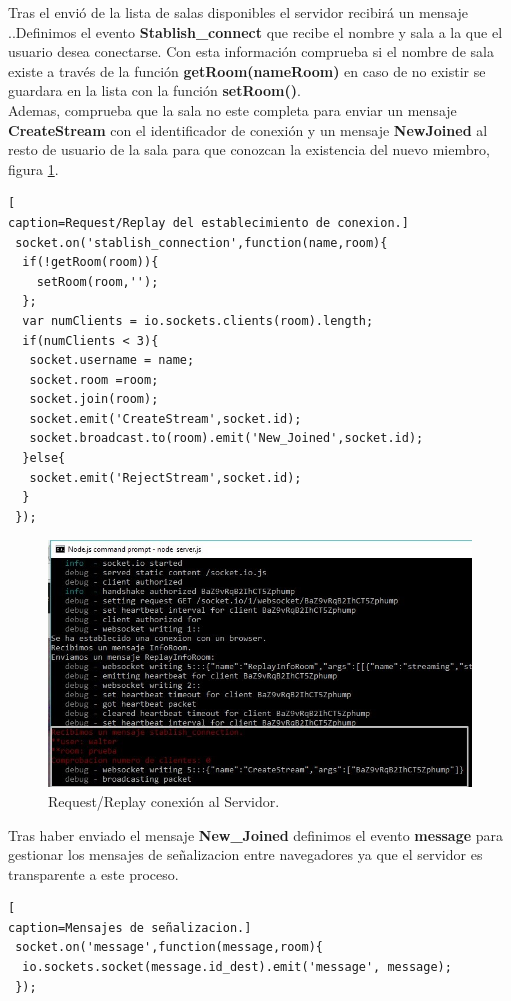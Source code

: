 Tras el envió de la lista de salas disponibles el servidor recibirá un mensaje ..Definimos el evento \textbf{Stablish\_connect} que recibe el nombre y sala a la que el usuario desea conectarse. Con esta información comprueba si el nombre de sala existe a través de la función \textbf{getRoom(nameRoom)} en caso de no existir se guardara en la lista con la función \textbf{setRoom()}.
\\Ademas, comprueba que la sala no este completa para enviar un mensaje \textbf{CreateStream} con el identificador de conexión y un mensaje  \textbf{NewJoined} al resto de usuario de la sala para que conozcan la existencia del nuevo miembro, figura \ref{fig:EjecucionStablishConnection}.
\begin{lstlisting}[
caption=Request/Replay del establecimiento de conexion.]
 socket.on('stablish_connection',function(name,room){
  if(!getRoom(room)){
    setRoom(room,'');
  };
  var numClients = io.sockets.clients(room).length;
  if(numClients < 3){
   socket.username = name;
   socket.room =room;
   socket.join(room);
   socket.emit('CreateStream',socket.id);
   socket.broadcast.to(room).emit('New_Joined',socket.id);
  }else{
   socket.emit('RejectStream',socket.id);
  }
 });
\end{lstlisting}
\begin{figure}[!h]
\begin{center}
   \includegraphics[width=0.8\linewidth]{Figures/StablishConnectionServer}
	\decoRule
	\caption[Request/Replay conexión Servidor]{Request/Replay conexión al Servidor.}
\label{fig:EjecucionStablishConnection}
\end{center}
\end{figure}
Tras haber enviado el mensaje \textbf{New\_Joined} definimos el evento \textbf{message} para gestionar los mensajes de señalizacion entre navegadores ya que el servidor es transparente a este proceso.
\begin{lstlisting}[
caption=Mensajes de señalizacion.]
 socket.on('message',function(message,room){
  io.sockets.socket(message.id_dest).emit('message', message);
 });
\end{lstlisting}
